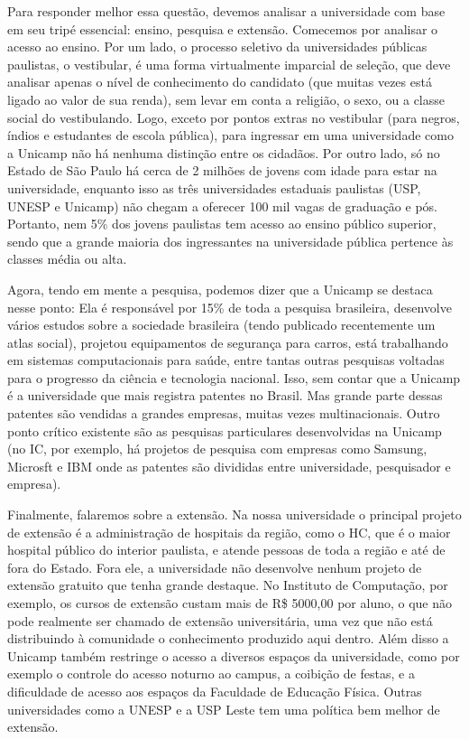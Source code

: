 Para responder melhor essa questão, devemos analisar a universidade com base em
seu tripé essencial: ensino, pesquisa e extensão. Comecemos por analisar o
acesso ao ensino. Por um lado, o processo seletivo da universidades públicas
paulistas, o vestibular, é uma forma virtualmente imparcial de seleção, que deve
analisar apenas o nível de conhecimento do candidato (que muitas vezes está
ligado ao valor de sua renda), sem levar em conta a religião, o sexo, ou a
classe social do vestibulando. Logo, exceto por pontos extras no vestibular
(para negros, índios e estudantes de escola pública), para ingressar em uma
universidade como a Unicamp não há nenhuma distinção entre os cidadãos. Por
outro lado, só no Estado de São Paulo há cerca de 2 milhões de jovens com idade
para estar na universidade, enquanto isso as três universidades estaduais
paulistas (USP, UNESP e Unicamp) não chegam a oferecer 100 mil vagas de
graduação e pós. Portanto, nem 5\% dos jovens paulistas tem acesso ao ensino
público superior, sendo que a grande maioria dos ingressantes na universidade
pública pertence às classes média ou alta.

Agora, tendo em mente a pesquisa, podemos dizer que a Unicamp se destaca nesse
ponto: Ela é responsável por 15\% de toda a pesquisa brasileira, desenvolve
vários estudos sobre a sociedade brasileira (tendo publicado recentemente um
atlas social), projetou equipamentos de segurança para carros, está trabalhando
em sistemas computacionais para saúde, entre tantas outras pesquisas voltadas
para o progresso da ciência e tecnologia nacional. Isso, sem contar que a
Unicamp é a universidade que mais registra patentes no Brasil. Mas grande parte
dessas patentes são vendidas a grandes empresas, muitas vezes multinacionais.
Outro ponto crítico existente são as pesquisas particulares desenvolvidas na
Unicamp (no IC, por exemplo, há projetos de pesquisa com empresas como Samsung,
Microsft e IBM onde as patentes são divididas entre universidade, pesquisador e
empresa).

Finalmente, falaremos sobre a extensão. Na nossa universidade o principal
projeto de extensão é a administração de hospitais da região, como o HC, que é o
maior hospital público do interior paulista, e atende pessoas de toda a região e
até de fora do Estado. Fora ele, a universidade não desenvolve nenhum projeto de
extensão gratuito que tenha grande destaque. No Instituto de Computação, por
exemplo, os cursos de extensão custam mais de R\$ 5000,00 por aluno, o que não
pode realmente ser chamado de extensão universitária, uma vez que não está
distribuindo à comunidade o conhecimento produzido aqui dentro.  Além disso a
Unicamp também restringe o acesso a diversos espaços da universidade, como por
exemplo o controle do acesso noturno ao campus, a coibição de festas, e a
dificuldade de acesso aos espaços da Faculdade de Educação Física. Outras
universidades como a UNESP e a USP Leste tem uma política bem melhor de
extensão.

